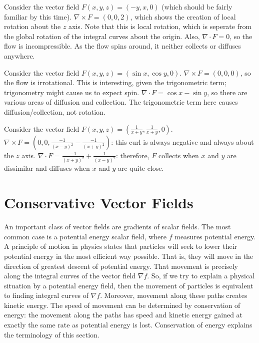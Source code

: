 \documentclass[fleqn,letterpaper]{report}
\begin{document}
\begin{example}
Consider the vector field $F(x,y,z) = (-y,x,0)$ (which should
be fairly familiar by this time). $\nabla \times F =
(0,0,2)$, which shows the creation of local rotation about the $z$
axis. Note that this is local rotation, which is seperate
from the global rotation of the integral curves about the
origin. Also, $\nabla \cdot F = 0$, so the flow is
incompressible. As the flow spins around, it neither collects
or diffuses anywhere.
\end{example}

\begin{example}
Consider the vector field $F(x,y,z) = (\sin x, \cos y, 0)$.
$\nabla \times F = (0,0,0)$, so the flow is irrotational.
This is interesting, given the trigonometric term;
trigonometry might cause us to expect spin. $\nabla \cdot F = \cos
x - \sin y$, so there are various areas of diffusion and
collection. The trigonometric term here causes
diffusion/collection, not rotation.
\end{example}

\begin{example}
Consider the vector field $F(x,y,z) = \left( \frac{1}{x+y},
\frac{1}{x+y}, 0 \right)$. $\nabla \times F = \left(0,0,
\frac{-1}{(x-y)^2} - \frac{-1}{(x+y)^2} \right)$: this curl is
always negative and always about the $z$ axis. $\nabla \cdot F
= \frac{-1}{(x+y)^2} + \frac{1}{(x-y)^2}$: therefore,
$F$ collects when $x$ and $y$ are dissimilar and diffuses
when $x$ and $y$ are quite close. 
\end{example}

\section{Conservative Vector Fields}
\label{conservative}

An important class of vector fields are gradients of scalar
fields. The most common case is a potential energy scalar
field, where $f$ measures potential energy. A principle of
motion in physics states that particles will seek to lower
their potential energy in the most efficient way possible.
That is, they will move in the direction of greatest descent
of potential energy. That movement is precisely along the
integral curves of the vector field $\nabla f$. So, if we try
to explain a physical situation by a potential energy field,
then the movement of particles is equivalent to finding
integral curves of $\nabla f$. Moreover, movement along these
paths creates kinetic energy. The speed of movement can be
determined by conservation of energy: the movement along the
paths has speed and kinetic energy gained at exactly the same
rate as potential energy is lost. Conservation of energy
explains the terminology of this section. 
\end{document}
